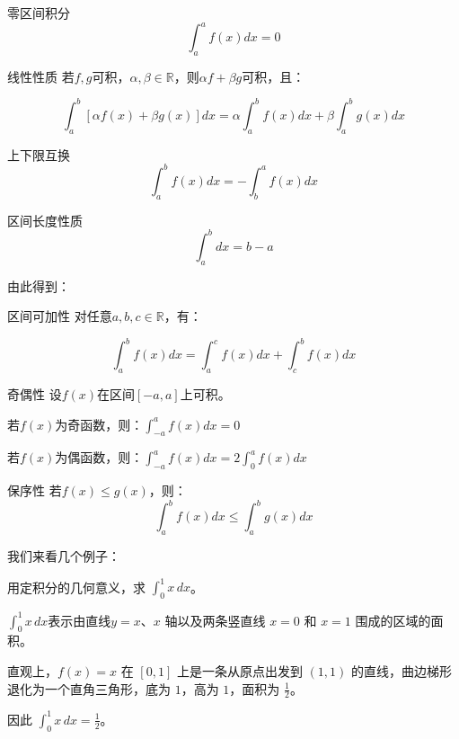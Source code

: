 \begin{theorem}{零区间积分}{}
  \[\int_{a}^{a} f(x) dx=0\]
\end{theorem}

\begin{theorem}{线性性质}{} 
  若$f,g$可积，$\alpha,\beta \in \mathbb{R}$，则$\alpha f+\beta g$可积，且：

  \[\int_{a}^{b} [\alpha f(x)+\beta g(x)] dx=\alpha \int_{a}^{b} f(x) dx+\beta \int_{a}^{b} g(x) dx\]
\end{theorem}

\begin{theorem}{上下限互换}{}
  \[\int_{a}^{b} f(x) dx=-\int_{b}^{a} f(x) dx\]
\end{theorem}

\begin{theorem}{区间长度性质}{}
  \[\int_{a}^{b} dx=b-a\]
\end{theorem}


由此得到：

\begin{theorem}{区间可加性}{} 
  对任意$a,b,c\in \mathbb{R} $，有：

  \[\int_{a}^{b} f(x) dx=\int_{a}^{c} f(x) dx+\int_{c}^{b} f(x) dx\]
\end{theorem}

\begin{theorem}{奇偶性}{} 
  设$f(x)$在区间$[-a,a]$上可积。

  若$f(x)$为奇函数，则：\(\int_{-a}^{a} f(x) dx=0\)

  若$f(x)$为偶函数，则：\(\int_{-a}^{a} f(x) dx=2\int_{0}^{a} f(x) dx\)
\end{theorem}

\begin{theorem}{保序性}{} 
  若$f(x)\leq g(x)$，则：
  \[\int_{a}^{b} f(x) dx \leq \int_{a}^{b} g(x) dx\]
\end{theorem}

我们来看几个例子：

\begin{myexample}
  用定积分的几何意义，求 $\int_0^1 x\, dx$。

  $\int_0^1 x\, dx$表示由直线$y=x$、$x$ 轴以及两条竖直线 $x = 0$ 和 $x = 1$ 围成的区域的面积。

  直观上，$f(x) = x$ 在 $[0, 1]$ 上是一条从原点出发到 $(1, 1)$ 的直线，曲边梯形退化为一个直角三角形，底为 $1$，高为 $1$，面积为 $\frac{1}{2}$。

  因此 $\int_0^1 x\, dx = \frac{1}{2}$。
\end{myexample}

